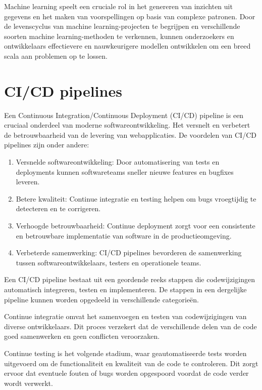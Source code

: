 Machine learning speelt een cruciale rol in het genereren van inzichten uit gegevens en het maken van voorspellingen op basis van complexe patronen. Door de levenscyclus van machine learning-projecten te begrijpen en verschillende soorten machine learning-methoden te verkennen, kunnen onderzoekers en ontwikkelaars effectievere en nauwkeurigere modellen ontwikkelen om een breed scala aan problemen op te lossen.
\section{CI/CD pipelines}

Een Continuous Integration/Continuous Deployment (CI/CD) pipeline is een cruciaal onderdeel van moderne softwareontwikkeling. Het versnelt en verbetert de betrouwbaarheid van de levering van webapplicaties. De voordelen van CI/CD pipelines zijn onder andere:

\begin{enumerate}[label=\arabic*.]
    \item Versnelde softwareontwikkeling: Door automatisering van tests en deployments kunnen softwareteams sneller nieuwe features en bugfixes leveren.
    \item Betere kwaliteit: Continue integratie en testing helpen om bugs vroegtijdig te detecteren en te corrigeren.
    \item Verhoogde betrouwbaarheid: Continue deployment zorgt voor een consistente en betrouwbare implementatie van software in de productieomgeving.
    \item Verbeterde samenwerking: CI/CD pipelines bevorderen de samenwerking tussen softwareontwikkelaars, testers en operationele teams.
\end{enumerate}

Een CI/CD pipeline bestaat uit een geordende reeks stappen die codewijzigingen automatisch integreren, testen en implementeren. De stappen in een dergelijke pipeline kunnen worden opgedeeld in verschillende categorieën.

Continue integratie omvat het samenvoegen en testen van codewijzigingen van diverse ontwikkelaars. Dit proces verzekert dat de verschillende delen van de code goed samenwerken en geen conflicten veroorzaken.

Continue testing is het volgende stadium, waar geautomatiseerde tests worden uitgevoerd om de functionaliteit en kwaliteit van de code te controleren. Dit zorgt ervoor dat eventuele fouten of bugs worden opgespoord voordat de code verder wordt verwerkt.


